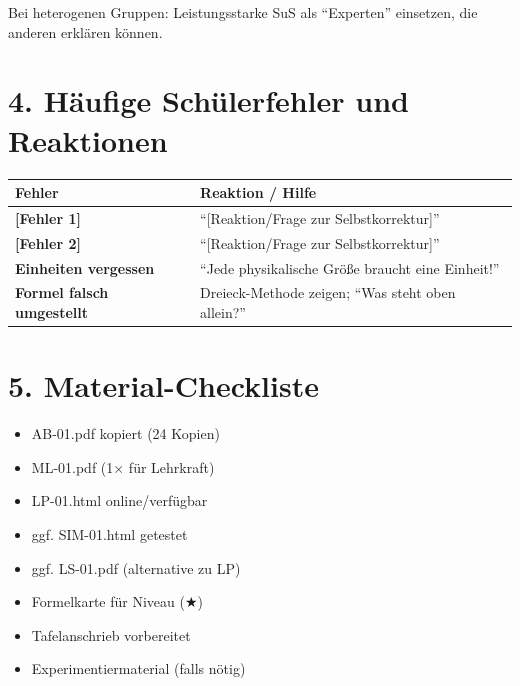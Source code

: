 \documentclass[11pt, a4paper]{article}
\newcommand{\stunde}{01}
\newcommand{\lerngruppengroesse}{24}
\begin{document}
\vspace{1em}

\begin{tippbox}
Bei heterogenen Gruppen: Leistungsstarke SuS als ``Experten'' einsetzen, die anderen erklären können.
\end{tippbox}


\section*{4. Häufige Schülerfehler und Reaktionen}

\begin{warnbox}
\begin{tabular}{|p{4.5cm}|p{8cm}|}
\hline
\textbf{Fehler} & \textbf{Reaktion / Hilfe} \\
\hline
\textbf{[Fehler 1]} & ``[Reaktion/Frage zur Selbstkorrektur]'' \\
\hline
\textbf{[Fehler 2]} & ``[Reaktion/Frage zur Selbstkorrektur]'' \\
\hline
\textbf{Einheiten vergessen} & ``Jede physikalische Größe braucht eine Einheit!'' \\
\hline
\textbf{Formel falsch umgestellt} & Dreieck-Methode zeigen; ``Was steht oben allein?'' \\
\hline
\end{tabular}
\end{warnbox}


\section*{5. Material-Checkliste}

\begin{itemize}
    \item[$\Box$] AB-\stunde.pdf kopiert (\lerngruppengroesse{} Kopien)
    \item[$\Box$] ML-\stunde.pdf (1× für Lehrkraft)
    \item[$\Box$] LP-\stunde.html online/verfügbar
    \item[$\Box$] ggf. SIM-\stunde.html getestet
    \item[$\Box$] ggf. LS-\stunde.pdf (alternative zu LP)
    \item[$\Box$] Formelkarte für Niveau (★)
    \item[$\Box$] Tafelanschrieb vorbereitet
    \item[$\Box$] Experimentiermaterial (falls nötig)
\end{itemize}
\end{document}

